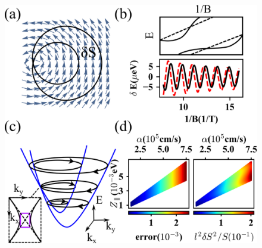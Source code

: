 \documentclass[aps, prb, showpacs, twocolumn, notitlepage, superscriptaddress]{revtex4-1}
\begin{document}
\begin{figure}
\includegraphics[width=1.0\columnwidth]{RZ.png}

\end{figure}
\end{document}
